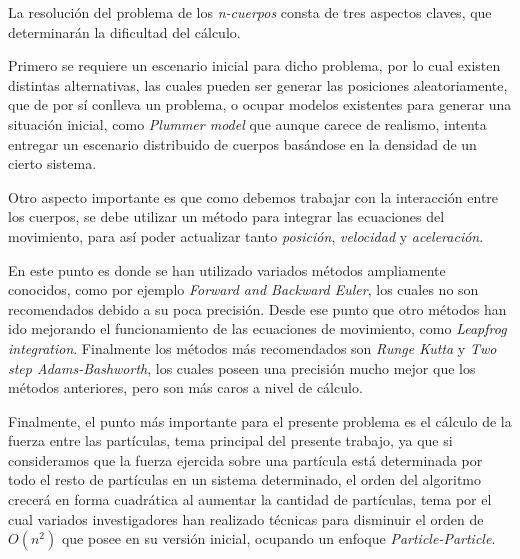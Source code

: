 
La resolución del problema de los \emph{n-cuerpos} consta de tres
aspectos claves, que determinarán la dificultad del cálculo.

Primero se requiere un escenario inicial para dicho problema,
por lo cual existen distintas alternativas, las cuales pueden ser
generar las posiciones aleatoriamente, que de por sí conlleva un problema,
o ocupar modelos existentes para generar una situación inicial,
como \emph{Plummer model} que aunque carece de realismo,
intenta entregar un escenario distribuido de cuerpos
basándose en la densidad de un cierto sistema.

Otro aspecto importante es que como debemos trabajar con la interacción
entre los cuerpos, se debe utilizar un método para integrar las ecuaciones
del movimiento, para así poder actualizar tanto \emph{posición}, \emph{velocidad}
y \emph{aceleración}. 

En este punto es donde se han utilizado variados métodos ampliamente conocidos,
como por ejemplo \emph{Forward and Backward Euler}, los cuales no son recomendados
debido a su poca precisión. Desde ese punto que otro métodos han ido mejorando
el funcionamiento de las ecuaciones de movimiento, como \emph{Leapfrog integration}.
Finalmente los métodos más recomendados son \emph{Runge Kutta} y \emph{Two step Adams-Bashworth},
los cuales poseen una precisión mucho mejor que los métodos anteriores, pero son
más caros a nivel de cálculo.

Finalmente, el punto más importante para el presente problema es el cálculo
de la fuerza entre las partículas, tema principal del presente trabajo,
ya que si consideramos que la fuerza ejercida sobre una partícula está determinada
por todo el resto de partículas en un sistema determinado, el orden del algoritmo
crecerá en forma cuadrática al aumentar la cantidad de partículas,
tema por el cual variados investigadores han realizado técnicas para disminuir
el orden de $O(n^2)$ que posee en su versión inicial, ocupando un enfoque
\emph{Particle-Particle}.

